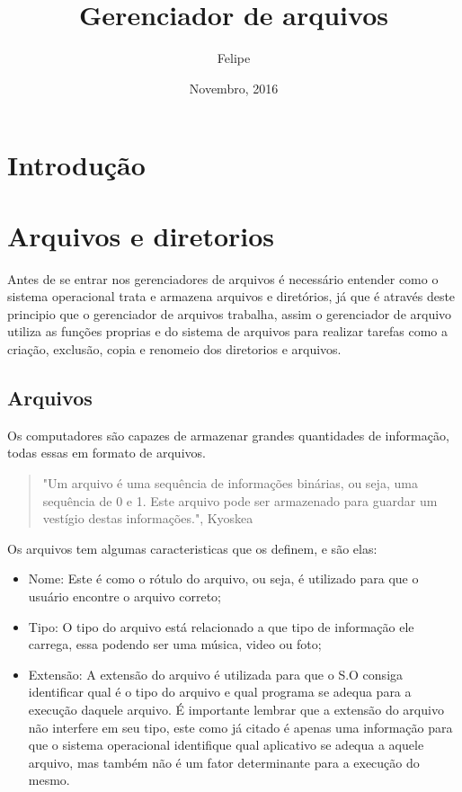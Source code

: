 \documentclass{article}
\title{Gerenciador de arquivos}
\author{Felipe}
\date{Novembro, 2016}
\begin{document}
\maketitle

\section{Introdução}


\section{Arquivos e diretorios}

Antes de se entrar nos gerenciadores de arquivos é necessário entender como o sistema operacional trata e armazena arquivos e diretórios, já que é através deste principio que o gerenciador de arquivos trabalha, assim o gerenciador de arquivo utiliza as funções proprias e do sistema de arquivos para realizar tarefas como a criação, exclusão, copia e renomeio dos diretorios e arquivos.

\subsection{Arquivos}

Os computadores são capazes de armazenar grandes quantidades de informação, todas essas em formato de arquivos.

 \begin{quote}
"Um arquivo é uma sequência de informações binárias, ou seja, uma sequência de 0 e 1. Este arquivo pode ser armazenado para guardar um vestígio destas informações.", Kyoskea
\end{quote}

Os arquivos tem algumas caracteristicas que os definem, e são elas:

\begin{itemize}

\item Nome: Este é como o rótulo do arquivo, ou seja, é utilizado para que o usuário encontre o arquivo correto;
\item Tipo: O tipo do arquivo está relacionado a que tipo de informação ele carrega, essa podendo ser uma música, video ou foto;
\item Extensão: A extensão do arquivo é utilizada para que o S.O consiga identificar qual é o tipo do arquivo e qual programa se adequa para a execução daquele arquivo. É importante lembrar que a extensão do arquivo não interfere em seu tipo, este como já citado é apenas uma informação para que o sistema operacional identifique qual aplicativo se adequa a aquele arquivo, mas também não é um fator determinante para a execução do mesmo.

\end{itemize}
\end{document}
